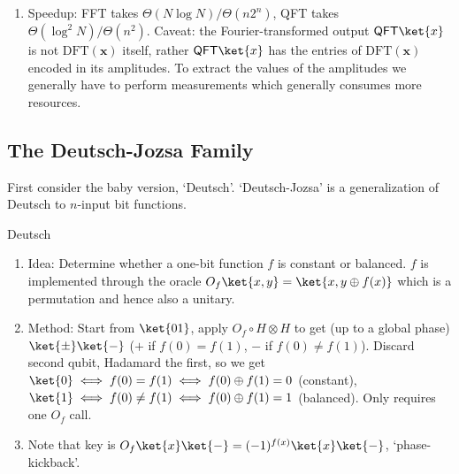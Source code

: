 \begin{enumerate}
    \item Speedup: FFT takes $\Theta(N \log N)/\Theta(n2^n)$, QFT takes $\Theta(\log^2 N)/\Theta(n^2)$. Caveat: the Fourier-transformed output $\mathsf{QFT}\ket{x}$ is not $\text{DFT}(\mathbf{x})$ itself, rather $\mathsf{QFT}\ket{x}$ has the entries of $\text{DFT}(\mathbf{x})$ encoded in its amplitudes. To extract the values of the amplitudes we generally have to perform measurements which generally consumes more resources.
\end{enumerate}


\subsection{The Deutsch-Jozsa Family}

First consider the baby version, `Deutsch'. `Deutsch-Jozsa' is a generalization of Deutsch to $n$-input bit functions.

Deutsch
\begin{enumerate}
    \item Idea: Determine whether a one-bit function $f$ is constant or balanced. $f$ is implemented through the oracle $O_f\ket{x,y} = \ket{x,y \oplus f(x)}$ which is a permutation and hence also a unitary.
    \item Method: Start from $\ket{01}$, apply $O_f \circ H \otimes H$ to get (up to a global phase) $\ket{\pm}\ket{-}$ ($+$ if $f(0)=f(1)$, $-$ if $f(0) \neq f(1)$). Discard second qubit, Hadamard the first, so we get $\ket{0} \iff f(0)=f(1) \iff f(0)\oplus f(1) = 0$ (constant), $\ket{1} \iff f(0)\neq f(1) \iff f(0)\oplus f(1) = 1$ (balanced). Only requires one $O_f$ call.
    \item Note that key is $O_f\ket{x}\ket{-} = (-1)^{f(x)}\ket{x}\ket{-}$, `phase-kickback'.
\end{enumerate}

